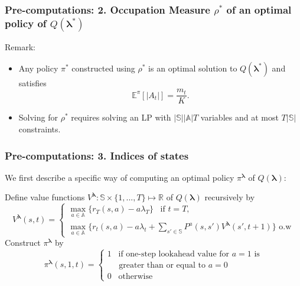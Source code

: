 \documentclass{beamer}
\newcommand{\lambdav}{\pmb{\lambda}}
\newcommand{\substates}{\mathbb{S}}
\newcommand{\subactions}{\mathbb{A}}
\newcommand{\subaction}{a}
\begin{document}
\begin{frame}
\frametitle{Pre-computations: 2. Occupation Measure $\rho^*$ of an optimal policy of $Q(\lambdav^*)$}
Remark: 
\begin{itemize}
\item Any policy $\pi^*$ constructed using $\rho^*$ is an optimal solution to $Q(\lambdav^*)$ and satisfies
\begin{equation}
\mathbb{E}^{\pi}[|A_t|]=\frac{m_t}{K}.
\end{equation} 
\item Solving for $\rho^*$ requires solving an LP with $|\substates||\subactions|T$ variables and at most $T|\substates|$ constraints.
\end{itemize}
\end{frame}

\begin{frame}
\frametitle{Pre-computations: 3. Indices of states}

We first describe a specific way of computing an optimal policy $\pi^{\lambdav}$ of $Q(\lambdav)$:

\vspace{0.5cm}
Define value functions $V^{\lambdav}:\substates\times \{1,...,T\}\mapsto \mathbb{R}$ of $Q(\lambdav)$ recursively by
\begin{equation}
V^{\lambdav}(s,t)=
\begin{cases}
	\max_{\subaction\in \subactions}\{r_T(s,a)-a\lambda_T\} \;\;\; \text{if $t=T$,}\\
	\max_{\subaction\in\subactions}\{r_t(s,a)-a\lambda_t+\sum_{s'\in\substates}P^{a}(s,s')V^{\lambdav}(s',t+1)\} \text{ o.w}
\end{cases} 
\end{equation}
Construct $\pi^{\lambdav}$ by
\begin{equation}
\pi^{\lambdav}(s,1,t)=
\begin{cases*}
1\;\;\;\text{if one-step lookahead value for $a=1$ is} \\
\;\;\;\;\;\text{greater than or equal to $a=0$}\\
0 \;\;\;\text{otherwise}
\end{cases*}
\end{equation}
\end{frame}
\end{document}
